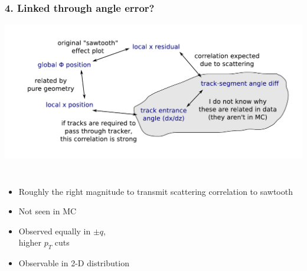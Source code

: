 \documentclass[compress]{beamer}
\begin{document}
\begin{frame}
\frametitle{4. Linked through angle error?}

\includegraphics[width=0.85\linewidth]{map_of_correlations5.pdf}

\vspace{-0.75 cm}
\begin{columns}

\begin{itemize}
\item Roughly the right magnitude to transmit scattering correlation
  to sawtooth
\item Not seen in MC
\item Observed equally in $\pm q$, \\ higher $p_T$ cuts
\item Observable in 2-D distribution
\end{itemize}


\end{columns}
\end{frame}
\end{document}
